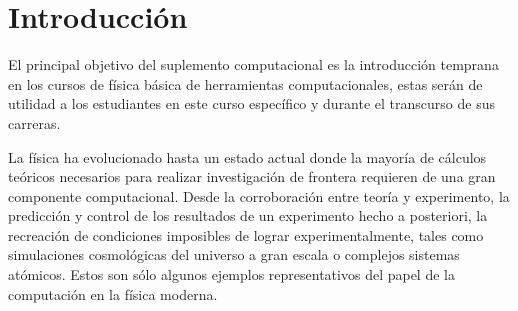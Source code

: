 \chapter{Introducción}

El principal objetivo del suplemento computacional es la introducción 
temprana en los cursos de física básica de herramientas computacionales, 
estas serán de utilidad a los estudiantes en este curso específico y 
durante el transcurso de sus carreras.


La física ha evolucionado hasta un estado actual donde la mayoría de 
cálculos teóricos necesarios para realizar investigación de frontera 
requieren de una gran componente computacional. Desde la corroboración 
entre teoría y experimento, la predicción y control de los resultados de 
un experimento hecho a posteriori, la recreación de condiciones imposibles 
de lograr experimentalmente, tales como simulaciones cosmológicas del 
universo a gran escala o complejos sistemas atómicos. Estos son sólo 
algunos ejemplos representativos del papel de la computación en la física 
moderna.
